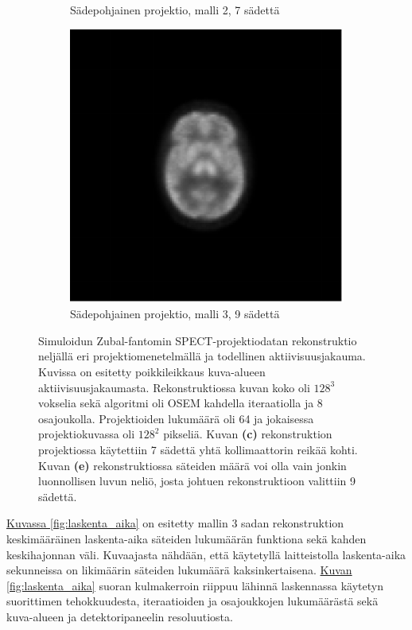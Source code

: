 \begin{figure}[H]
\begin{subfigure}[b]{.25\textwidth}
        \caption{Sädepohjainen projektio, malli 2, 7 sädettä}
    \end{subfigure}%
    \hspace{.075\textwidth}%
    \begin{subfigure}[b]{.25\textwidth}
        \includegraphics[width=\linewidth]{kuvat/cbf_rekonstruktio_proj1_malli3_nRay9.pdf}
        \caption{Sädepohjainen projektio, malli 3, 9 sädettä}
    \end{subfigure}
    \caption{Simuloidun Zubal-fantomin SPECT-projektiodatan rekonstruktio neljällä eri projektiomenetelmällä ja todellinen aktiivisuusjakauma. Kuvissa on esitetty poikkileikkaus kuva-alueen aktiivisuusjakaumasta. Rekonstruktiossa kuvan koko oli $128^3$ vokselia sekä algoritmi oli OSEM kahdella iteraatiolla ja 8 osajoukolla. Projektioiden lukumäärä oli 64 ja jokaisessa projektiokuvassa oli $128^2$ pikseliä. Kuvan \textbf{(c)} rekonstruktion projektiossa käytettiin 7 sädettä yhtä kollimaattorin reikää kohti. Kuvan \textbf{(e)} rekonstruktiossa säteiden määrä voi olla vain jonkin luonnollisen luvun neliö, josta johtuen rekonstruktioon valittiin 9 sädettä.}
    \label{fig:cbf-rekonstruktiot}
\end{figure}

\hyperref[fig:laskenta_aika]{Kuvassa \ref*{fig:laskenta_aika}} on esitetty mallin 3 sadan rekonstruktion keskimääräinen laskenta-aika säteiden lukumäärän funktiona sekä kahden keskihajonnan väli. Kuvaajasta nähdään, että käytetyllä laitteistolla laskenta-aika sekunneissa on likimäärin säteiden lukumäärä kaksinkertaisena. \hyperref[fig:laskenta_aika]{Kuvan \ref*{fig:laskenta_aika}} suoran kulmakerroin riippuu lähinnä laskennassa käytetyn suorittimen tehokkuudesta, iteraatioiden ja osajoukkojen lukumäärästä sekä kuva-alueen ja detektoripaneelin resoluutiosta.


